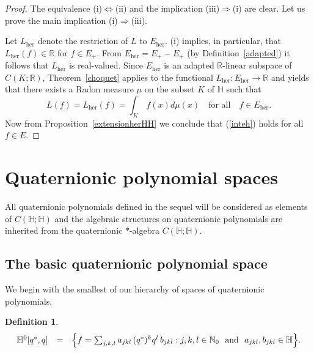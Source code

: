 \documentclass[11pt,a4paper]{amsart}
\theoremstyle{definition}
\newtheorem{definition}[theorem]{Definition}
\begin{document}
%
\begin{proof}
The equivalence (i)$\iff $(ii) and the implication (iii)$\Rightarrow $(i)
are clear. Let us prove the main implication (i)$\Rightarrow $(iii).

Let $L_{\mathrm{her}}$ denote the restriction of $L$ to
$E_{\mathrm{her}}$. (i) implies, in particular, that
$L_{\mathrm{her}}(f)\in \mathbb{R}$ for $f\in E_{+}$. From
$E_{\mathrm{her}}=E_{+}-E_{+}$ (by Definition~\ref{adapted}) it follows
that $L_{\mathrm{her}}$ is real-valued. Since $E_{\mathrm{her}}$ is an
adapted $\mathbb{R}$-linear subspace of $C(K; \mathbb{R})$, Theorem~\ref{choquet} applies to the functional
$L_{\mathrm{her}}:E_{\mathrm{her}}\to \mathbb{R}$ and yields that there
exists a Radon measure $\mu $ on the subset $K$ of $\mathbb{H}$ such that
%
\begin{equation*}
L(f)= L_{\mathrm{her}}(f) = \int _{K}\, f(x) d\mu (x)\quad
\text{for all}\quad f \in E_{\mathrm{her}}.
\end{equation*}
%
Now from Proposition~\ref{extensionherHH} we conclude that (\ref{inteh})
holds for all $f\in E$.%
\end{proof}

\section{Quaternionic polynomial spaces}
\label{polynomialspaces}

All quaternionic polynomials defined in the sequel will be considered as
elements of $C(\mathbb{H}; \mathbb{H})$ and the algebraic structures on
quaternionic polynomials are inherited from the quaternionic $*$-algebra
$C(\mathbb{H}; \mathbb{H})$.

\subsection{The basic quaternionic polynomial space}
\label{sec4.1}

We begin with the smallest of our hierarchy of spaces of quaternionic polynomials.
%
\begin{definition}%
\label{defih0}
%
\begin{equation*}
%
\begin{array}{l@{\quad}l@{\quad}l}
\mathbb{H}^{0}[q^{*}, q] &=& \Big\{f= \sum _{j,k,l} a_{jkl}\, (q^{*})^{k}
q^{l}\, b_{jkl} : j, k,l \in \mathbb{N}_{0}~ \textrm{ and }~ a_{jkl}, b_{jkl}
\in \mathbb{H}\Big\}.
\end{array}
%
\end{equation*}
%
\end{definition}
\end{document}
